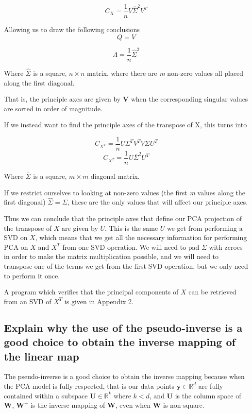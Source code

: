 \documentclass[11pt,a4paper,landscape]{article}
\begin{document}
$$ C_{X} = \frac{1}{n} V \widehat{\Sigma}^{2} V^{T}  $$

Allowing us to draw the following conclusions
$$ Q = V $$

$$ \Lambda =  \frac{1}{n} \widehat{\Sigma}^{2}$$

Where $\widehat{\Sigma}$ is a square, $n \times n$ matrix, where there are \textit{m} non-zero values all placed along the first diagonal.\newline

That is, the principle axes are given by \textbf{V} when the corresponding singular values are sorted in order of magnitude.

If we instead want to find the principle axes of the transpose of X, this turns into

$$ C_{X^{T}} = \frac{1}{n} U \Sigma^{T} V^{T} V\Sigma U^{T}  $$
$$ C_{X^{T}} = \frac{1}{n} U \overline{\Sigma}^{2} U^{T}  $$

Where $\overline{\Sigma}$ is a square, $m \times m$ diagonal matrix.\newline


If we restrict ourselves to looking at non-zero values (the first \textit{m} values along the first diagonal) $\widehat{\Sigma} = \overline{\Sigma} $, these are the only values that will affect our principle axes.\newline

Thus we can conclude that the principle axes that define our PCA projection of the transpose of $X$ are given by $U$. This is the same $U$ we get from performing a SVD on $X$, which means that we get all the necessary information for performing PCA on $X$ and $X^{T}$ from one SVD operation. We will  need to pad $\Sigma$ with zeroes in order to make the matrix multiplication possible, and we will need to transpose one of the terms we get from the first SVD operation,  but we only need to perform it once.\newline

A program which verifies that the principal components of $X$ can be retrieved from an SVD of $X^{T}$ is given in Appendix 2.

\subsection{Explain why the use of the pseudo-inverse is a good choice to obtain the inverse mapping of the linear map}

The pseudo-inverse is a good choice to obtain the inverse mapping because when the PCA model is fully respected, that is our data points $\textbf{y} \in \mathbb{R}^d$ are fully contained within a subspace $\textbf{U} \in \mathbb{R}^k$ where $k < d$, and \textbf{U} is the column space of \textbf{W}, $\textbf{W}^+$ is the inverse mapping of \textbf{W}, even when \textbf{W} is non-square.\newline
\end{document}
